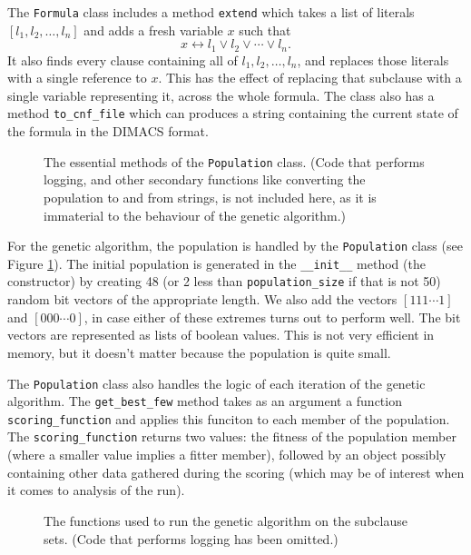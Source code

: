 \documentclass[proof,pdftex,11pt,a4,titlepage]{article}
\def\code{\lstinline[basicstyle=\textsize\ttfamily]}
\begin{document}
The \code{Formula} class includes a method \code{extend} which takes a list of literals $[l_1, l_2, \ldots, l_n]$ and adds a fresh variable $x$ such that
\[x \leftrightarrow l_1 \vee l_2 \vee \cdots \vee l_n.\]
It also finds every clause containing all of $l_1, l_2, \ldots, l_n$, and replaces those literals with a single reference to $x$. This has the effect of replacing that subclause with a single variable representing it, across the whole formula. The class also has a method \code{to_cnf_file} which can produces a string containing the current state of the formula in the DIMACS format.

\begin{figure}[p]
  
  \caption{The essential methods of the \code{Population} class. (Code that performs logging, and other secondary functions like converting the population to and from strings, is not included here, as it is immaterial to the behaviour of the genetic algorithm.)}
  \label{fig:population-class}
\end{figure}

For the genetic algorithm, the population is handled by the \code{Population} class (see Figure \ref{fig:population-class}). The initial population is generated in the \code{__init__} method (the constructor) by creating 48 (or 2 less than \code{population_size} if that is not 50) random bit vectors of the appropriate length. We also add the vectors $[111\cdots1]$ and $[000\cdots0]$, in case either of these extremes turns out to perform well. The bit vectors are represented as lists of boolean values. This is not very efficient in memory, but it doesn't matter because the population is quite small.

The \code{Population} class also handles the logic of each iteration of the genetic algorithm. The \code{get_best_few} method takes as an argument a function \code{scoring_function} and applies this funciton to each member of the population. The \code{scoring_function} returns two values: the fitness of the population member (where a smaller value implies a fitter member), followed by an object possibly containing other data gathered during the scoring (which may be of interest when it comes to analysis of the run).

\begin{figure}[h]
  
  \caption{The functions used to run the genetic algorithm on the subclause sets. (Code that performs logging has been omitted.)}
  \label{fig:run-functions}
\end{figure}
\end{document}
